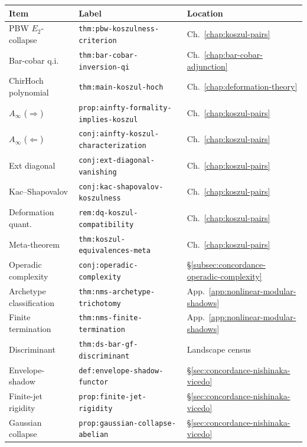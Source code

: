 \begin{center}
\renewcommand{\arraystretch}{1.15}
\begin{tabular}{@{}p{3.6cm}lp{4.5cm}@{}}
\toprule
\textbf{Item} & \textbf{Label} & \textbf{Location} \\
\midrule
PBW $E_2$-collapse
  & \texttt{thm:pbw-koszulness-criterion}
  & Ch.~\ref{chap:koszul-pairs} \\
Bar-cobar q.i.\
  & \texttt{thm:bar-cobar-inversion-qi}
  & Ch.~\ref{chap:bar-cobar-adjunction} \\
ChirHoch polynomial
  & \texttt{thm:main-koszul-hoch}
  & Ch.~\ref{chap:deformation-theory} \\
$A_\infty$ ($\Rightarrow$)
  & \texttt{prop:ainfty-formality-implies-koszul}
  & Ch.~\ref{chap:koszul-pairs} \\
$A_\infty$ ($\Leftarrow$)
  & \texttt{conj:ainfty-koszul-characterization}
  & Ch.~\ref{chap:koszul-pairs} \\
Ext diagonal
  & \texttt{conj:ext-diagonal-vanishing}
  & Ch.~\ref{chap:koszul-pairs} \\
Kac--Shapovalov
  & \texttt{conj:kac-shapovalov-koszulness}
  & Ch.~\ref{chap:koszul-pairs} \\
Deformation quant.
  & \texttt{rem:dq-koszul-compatibility}
  & Ch.~\ref{chap:koszul-pairs} \\
Meta-theorem
  & \texttt{thm:koszul-equivalences-meta}
  & Ch.~\ref{chap:koszul-pairs} \\
Operadic complexity
  & \texttt{conj:operadic-complexity}
  & \S\ref{subsec:concordance-operadic-complexity} \\
Archetype classification
  & \texttt{thm:nms-archetype-trichotomy}
  & App.~\ref{app:nonlinear-modular-shadows} \\
Finite termination
  & \texttt{thm:nms-finite-termination}
  & App.~\ref{app:nonlinear-modular-shadows} \\
Discriminant
  & \texttt{thm:ds-bar-gf-discriminant}
  & Landscape census \\
Envelope-shadow
  & \texttt{def:envelope-shadow-functor}
  & \S\ref{sec:concordance-nishinaka-vicedo} \\
Finite-jet rigidity
  & \texttt{prop:finite-jet-rigidity}
  & \S\ref{sec:concordance-nishinaka-vicedo} \\
Gaussian collapse
  & \texttt{prop:gaussian-collapse-abelian}
  & \S\ref{sec:concordance-nishinaka-vicedo} \\
\bottomrule
\end{tabular}
\end{center}


